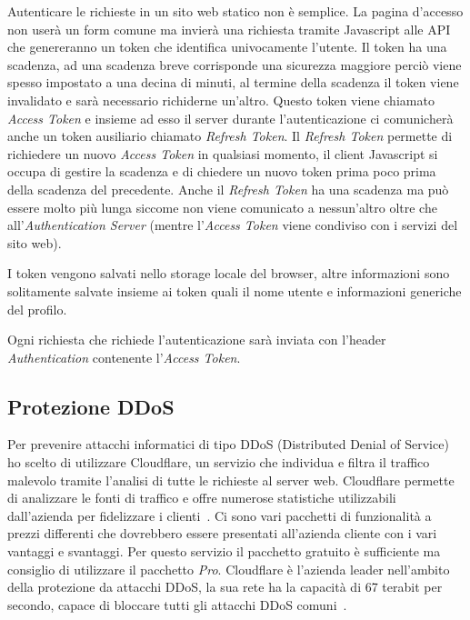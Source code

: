 Autenticare le richieste in un sito web statico non \`e semplice. La pagina d'accesso non user\`a un form comune ma invier\`a una richiesta tramite Javascript alle API che genereranno un token che identifica univocamente l'utente. Il token ha una scadenza, ad una scadenza breve corrisponde una sicurezza maggiore perci\`o viene spesso impostato a una decina di minuti, al termine della scadenza il token viene invalidato e sar\`a necessario richiderne un'altro. Questo token viene chiamato \emph{Access Token} e insieme ad esso il server durante l'autenticazione ci comunicher\`a anche un token ausiliario chiamato \emph{Refresh Token}. Il \emph{Refresh Token} permette di richiedere un nuovo \emph{Access Token} in qualsiasi momento, il client Javascript si occupa di gestire la scadenza e di chiedere un nuovo token prima poco prima della scadenza del precedente. Anche il \emph{Refresh Token} ha una scadenza ma pu\`o essere molto pi\`u lunga siccome non viene comunicato a nessun'altro oltre che all'\emph{Authentication Server} (mentre l'\emph{Access Token} viene condiviso con i servizi del sito web).

I token vengono salvati nello storage locale del browser, altre informazioni sono solitamente salvate insieme ai token quali il nome utente e informazioni generiche del profilo.

Ogni richiesta che richiede l'autenticazione sar\`a inviata con l'header \emph{Authentication} contenente l'\emph{Access Token}.

\subsection{Protezione DDoS}%
\label{sub:pretezione_ddos}

Per prevenire attacchi informatici di tipo DDoS (Distributed Denial of Service) ho scelto di utilizzare Cloudflare, un servizio che individua e filtra il traffico malevolo tramite l'analisi di tutte le richieste al server web. Cloudflare permette di analizzare le fonti di traffico e offre numerose statistiche utilizzabili dall'azienda per fidelizzare i clienti~\cite{cloudflare-ddos}. Ci sono vari pacchetti di funzionalit\`a a prezzi differenti che dovrebbero essere presentati all'azienda cliente con i vari vantaggi e svantaggi. Per questo servizio il pacchetto gratuito \`e sufficiente ma consiglio di utilizzare il pacchetto \emph{Pro}. Cloudflare \`e l'azienda leader nell'ambito della protezione da attacchi DDoS, la sua rete ha la capacit\`a di 67 terabit per secondo, capace di bloccare tutti gli attacchi DDoS comuni~\cite{cloudflare-research}.

